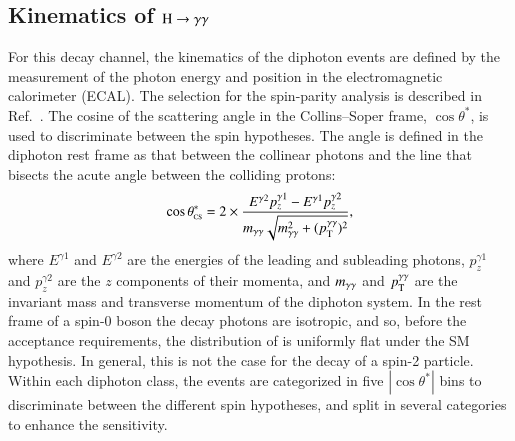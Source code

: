 \subsection{Kinematics of $\mathrm{H}\to\gamma\gamma$}
\label{sec:hggkinematics}

For this decay channel, the kinematics of the diphoton events are
defined by the measurement of the photon energy and position in the
electromagnetic calorimeter (ECAL). The selection for the spin-parity
analysis is described in Ref.~\cite{Khachatryan:2014ira}. The cosine
of the scattering angle in the Collins--Soper frame, $\cos\theta^*$,
is used to discriminate between the spin hypotheses.  The angle is
defined in the diphoton rest frame as that between the collinear
photons and the line that bisects the acute angle between the
colliding protons:
%
\begin{equation}
  \cos\theta^{\ast}_{\mbox{\tiny{CS}}}=2\times\frac{E^{\gamma2}p^{\gamma1}_{z}-E^{\gamma1}p^{\gamma2}_{z}}{m_{\gamma\gamma}\sqrt{m_{\gamma\gamma}^{2}+(p_{\mathrm{T}}^{\gamma\gamma})^{2}}},
\end{equation}
%
where $E^{\gamma1}$ and $E^{\gamma2}$ are the energies of the leading
and subleading photons, $p^{\gamma1}_{z}$ and $p^{\gamma2}_{z}$ are
the $z$ components of their momenta, and $m_{\gamma\gamma}$ and $p_{\mathrm{T}}^{\gamma\gamma}$ are the
invariant mass and transverse momentum of the diphoton system.  In the
rest frame of a spin-0 boson the decay photons are isotropic, and so,
before the acceptance requirements, the distribution of \costhetastar
is uniformly flat under the SM hypothesis.  In general, this is not
the case for the decay of a spin-2 particle.  Within each diphoton
class, the events are categorized in five $|\cos\theta^*|$ bins to
discriminate between the different spin hypotheses, and split in
several categories to enhance the sensitivity.
%

